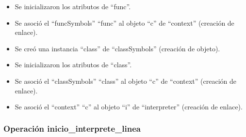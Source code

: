 \begin{description}
\begin {itemize}
         \item Se inicializaron los atributos de ``func''.
         \item Se asoció el ``funcSymbols'' ``func'' al objeto ``c'' de ``context'' (creación de enlace).
         \item Se creó una instancia ``class'' de ``classSymbols'' (creación de objeto).
         \item Se inicializaron los atributos de ``class''.
         \item Se asoció el ``classSymbols'' ``class'' al objeto ``c'' de ``context'' (creación de enlace).
         \item Se asoció el ``context'' ``c'' al objeto ``i'' de ``interpreter'' (creación de enlace).
      \end{itemize}
	\end{description}


\subsubsection{Operación inicio\_interprete\_linea}


